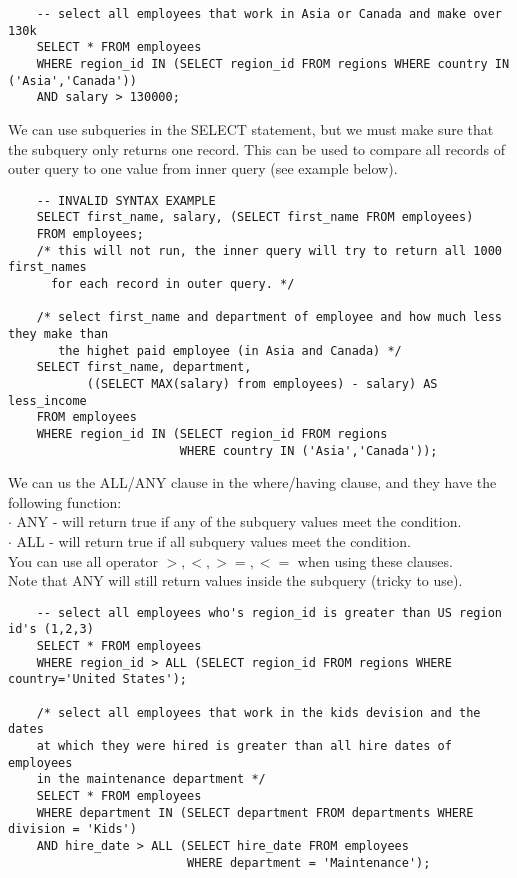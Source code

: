 \documentclass[11pt, a4paper]{article}
\begin{document}
\begin{spacing}{1.1}
\begin{lstlisting}
	-- select all employees that work in Asia or Canada and make over 130k
	SELECT * FROM employees
	WHERE region_id IN (SELECT region_id FROM regions WHERE country IN ('Asia','Canada')) 
	AND salary > 130000;\end{lstlisting} \vspace*{1mm}
	We can use subqueries in the SELECT statement, but we must make sure that the subquery only returns one record. This can be used to compare all records of outer query to one value from inner query (see example below).
	\begin{lstlisting}
	-- INVALID SYNTAX EXAMPLE
	SELECT first_name, salary, (SELECT first_name FROM employees)
	FROM employees; 
	/* this will not run, the inner query will try to return all 1000 first_names 
	  for each record in outer query. */
	
	/* select first_name and department of employee and how much less they make than 
	   the highet paid employee (in Asia and Canada) */
	SELECT first_name, department, 
	       ((SELECT MAX(salary) from employees) - salary) AS less_income
	FROM employees
	WHERE region_id IN (SELECT region_id FROM regions 
	                    WHERE country IN ('Asia','Canada')); \end{lstlisting} \newpage
	\noindent We can us the ALL/ANY clause in the where/having clause, and they have the following function: \\
	\hspace*{3mm} $\cdot$ ANY - will return true if any of the subquery values meet the condition. \\
	\hspace*{3mm} $\cdot$ ALL - will return true if all subquery values meet the condition. \\
	You can use all operator $>, <, >=, <=$ when using these clauses. \\
	Note that ANY will still return values inside the subquery (tricky to use).
	\begin{lstlisting}
	-- select all employees who's region_id is greater than US region id's (1,2,3)
	SELECT * FROM employees
	WHERE region_id > ALL (SELECT region_id FROM regions WHERE country='United States');
	
	/* select all employees that work in the kids devision and the dates
	at which they were hired is greater than all hire dates of employees
	in the maintenance department */
	SELECT * FROM employees
	WHERE department IN (SELECT department FROM departments WHERE division = 'Kids')
	AND hire_date > ALL (SELECT hire_date FROM employees 
	                     WHERE department = 'Maintenance');
	

\end{lstlisting}
\end{spacing}
\end{document}
